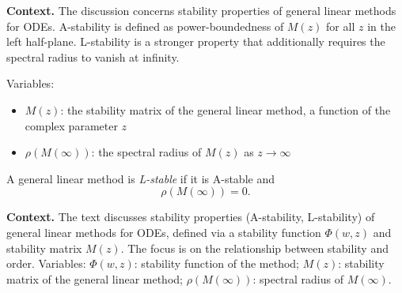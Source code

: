 \noindent\textbf{Context.}
The discussion concerns stability properties of general linear methods for ODEs. A-stability is defined as power-boundedness of \(M(z)\) for all \(z\) in the left half-plane. L-stability is a stronger property that additionally requires the spectral radius to vanish at infinity.

Variables:
\begin{itemize}
    \item \(M(z)\): the stability matrix of the general linear method, a function of the complex parameter \(z\)
    \item \(\rho(M(\infty))\): the spectral radius of \(M(z)\) as \(z \to \infty\)
\end{itemize}

\begin{definition}

  \label{def:520F}
A general linear method is \textit{L-stable} if it is A-stable and
\[
\rho(M(\infty)) = 0.
\]
\end{definition}

\noindent\textbf{Context.}
The text discusses stability properties (A-stability, L-stability) of general linear methods for ODEs, defined via a stability function $\Phi(w,z)$ and stability matrix $M(z)$. The focus is on the relationship between stability and order. Variables: $\Phi(w, z)$: stability function of the method; $M(z)$: stability matrix of the general linear method; $\rho(M(\infty))$: spectral radius of $M(\infty)$.

